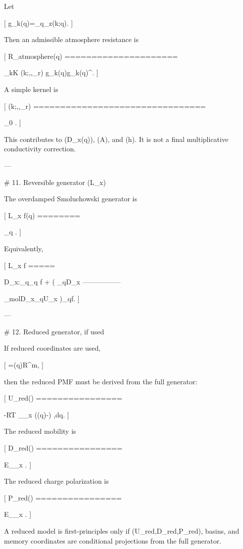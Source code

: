 Let

[
g_k(q)=\nabla_q\rho_z(k;q).
]

Then an admissible atmosphere resistance is

[
R_{\rm atmosphere}(q)
=====================

\sum_{k\in\mathcal K}
\Gamma(k;\kappa,\eta,\epsilon_r)
g_k(q)g_k(q)^\top.
]

A simple kernel is

[
\Gamma(k;\kappa,\eta,\epsilon_r)
================================

\Gamma_0
\eta.
]

This contributes to (D_x(q)), (A), and (h). It is not a final multiplicative conductivity correction.

---

# 11. Reversible generator (L_x)

The overdamped Smoluchowski generator is

[
L_x f(q)
========

\nabla_q\cdot
{}.
]

Equivalently,

[
L_x f
=====

D_x:\nabla_q\nabla_q f
+
\left(
\nabla_q\cdot D_x
-----------------

\beta_{\rm mol}D_x\nabla_qU_x
\right)\cdot\nabla_qf.
]

---

# 12. Reduced generator, if used

If reduced coordinates are used,

[
\xi=\Xi(q)\in\mathbb R^m,
]

then the reduced PMF must be derived from the full generator:

[
U_{\rm red}(\xi)
================

-RT\log
\int_{\Omega_x}
\delta(\Xi(q)-\xi)
\exp[-U_x(q)/(RT)],\mathrm dq.
]

The reduced mobility is

[
D_{\rm red}(\xi)
================

\mathbb E_{\mu_x}
\left[
\nabla_q\Xi(q)D_x(q)\nabla_q\Xi(q)^\top
\mid
\Xi(q)=\xi
\right].
]

The reduced charge polarization is

[
P_{\rm red}(\xi)
================

\mathbb E_{\mu_x}
\left[
P_x(q)\mid \Xi(q)=\xi
\right].
]

A reduced model is first-principles only if (U_{\rm red},D_{\rm red},P_{\rm red}), basins, and memory coordinates are conditional projections from the full generator.

